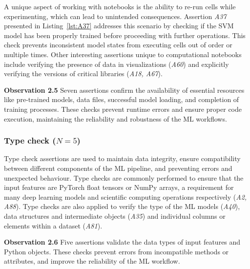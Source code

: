 \documentclass[smallextended]{svjour3}       %
\newcommand{\highlight}[1]{\begin{framed}%
  \noindent#1
\end{framed}}
\providecommand{\DIFaddbegin}{} %
\providecommand{\DIFaddend}{} %
\providecommand{\DIFdelbegin}{} %
\providecommand{\DIFdelend}{} %
\newcommand{\DIFscaledelfig}{0.5}
\newlength{\DIFdelgraphicswidth} %
\newlength{\DIFdelgraphicsheight} %
\newcommand{\DIFaddincludegraphics}[2][]{{\color{blue}\fbox{\DIFOincludegraphics[#1]{#2}}}} %
\newcommand{\DIFdelincludegraphics}[2][]{%
\sbox{\DIFdelgraphicsbox}{\DIFOincludegraphics[#1]{#2}}%
\settoboxwidth{\DIFdelgraphicswidth}{\DIFdelgraphicsbox} %
\settoboxtotalheight{\DIFdelgraphicsheight}{\DIFdelgraphicsbox} %
\scalebox{\DIFscaledelfig}{%
\parbox[b]{\DIFdelgraphicswidth}{\usebox{\DIFdelgraphicsbox}\\[-\baselineskip] \rule{\DIFdelgraphicswidth}{0em}}\llap{\resizebox{\DIFdelgraphicswidth}{\DIFdelgraphicsheight}{%
\setlength{\unitlength}{\DIFdelgraphicswidth}%
\begin{picture}(1,1)%
\thicklines\linethickness{2pt} %
{\color[rgb]{1,0,0}\put(0,0){\framebox(1,1){}}}%
{\color[rgb]{1,0,0}\put(0,0){\line( 1,1){1}}}%
{\color[rgb]{1,0,0}\put(0,1){\line(1,-1){1}}}%
\end{picture}%
}\hspace*{3pt}}} %
} %
\DeclareRobustCommand{\DIFaddbegin}{\DIFOaddbegin \let\includegraphics\DIFaddincludegraphics} %
\DeclareRobustCommand{\DIFaddend}{\DIFOaddend \let\includegraphics\DIFOincludegraphics} %
\DeclareRobustCommand{\DIFdelbegin}{\DIFOdelbegin \let\includegraphics\DIFdelincludegraphics} %
\DeclareRobustCommand{\DIFdelend}{\DIFOaddend \let\includegraphics\DIFOincludegraphics} %
\begin{document}
A unique aspect of working with notebooks is the ability to re-run cells while experimenting, which can lead to unintended consequences. Assertion \emph{A37} presented in Listing~\ref{lst:A37} addresses this scenario by checking if the SVM model has been properly trained before proceeding with further operations. This check prevents inconsistent model states from executing cells out of order or multiple times. Other interesting assertions unique to computational notebooks include verifying the presence of data in visualizations (\emph{A60}) and explicitly verifying the versions of critical libraries (\emph{A18, A67}).

\DIFdelbegin %
\DIFdelend \DIFaddbegin \highlight{\textbf{Observation 2.5} Seven assertions confirm the availability of essential resources like pre-trained models, data files, successful model loading, and completion of training processes. These checks prevent runtime errors and ensure proper code execution, maintaining the reliability and robustness of the ML workflows.}
\DIFaddend 

\subsubsection{Type check ($N = 5$)}

Type check assertions are used to maintain data integrity, ensure compatibility between different components of the ML pipeline, and preventing errors and unexpected behaviour. Type checks are commonly performed to ensure that the input features are PyTorch float tensors or NumPy arrays, a requirement for many deep learning models and scientific computing operations respectively (\emph{A2, A88}). Type checks are also applied to verify the type of the ML models (\emph{A40}), data structures and intermediate objects (\emph{A35}) and individual columns or elements within a dataset (\emph{A81}).

\DIFdelbegin %
\DIFdelend \DIFaddbegin \highlight{\textbf{Observation 2.6} Five assertions validate the data types of input features and Python objects. These checks prevent errors from incompatible methods or attributes, and improve the reliability of the ML workflow.}
\DIFaddend 
\end{document}
